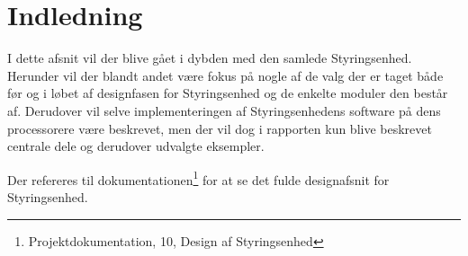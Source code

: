 
\section{Indledning}

I dette afsnit vil der blive gået i dybden med den samlede Styringsenhed. Herunder vil der blandt andet være fokus på nogle af de valg der er taget både før og i løbet af designfasen for Styringsenhed og de enkelte moduler den består af. Derudover vil selve implementeringen af Styringsenhedens software på dens processorere være beskrevet, men der vil dog i rapporten kun blive beskrevet centrale dele og derudover udvalgte eksempler.



Der refereres til dokumentationen\footnote{Projektdokumentation, 10, Design af Styringsenhed} for at se det fulde designafsnit for Styringsenhed.


